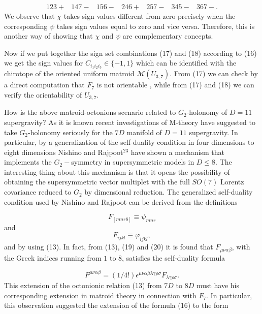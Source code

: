 \documentclass[a4paper,12pt]{article}
\begin{document}
\begin{equation}
\begin{array}{ccccccc}
123+ & 147- & 156- & 246+ & 257- & 345- & 367-.
\end{array}
\label{18}
\end{equation}
We observe that $\chi $ takes sign values different from zero precisely when
the corresponding $\psi $ takes sign values equal to zero and vice versa.
Therefore, this is another way of showing that $\chi $ and $\psi $ are
complementary concepts.

Now if we put together the sign set combinations (17) and (18) according to
(16) we get the sign values for $C_{i_{1}i_{2}i_{3}}\in \{-1,1\}$ which can
be identified with the chirotope of the oriented uniform matroid $\mathcal{M}%
(U_{3,7}).$ From (17) we can check by a direct computation that $F_{7}$ is
not orientable , while from (17) and (18) we can verify the orientability of 
$U_{3,7}$.

How is the above matroid-octonions scenario related to $G_{2}$-holonomy of $%
D=11$ supergravity? As it is known recent investigations of M-theory have
suggested to take $G_{2}$-holonomy seriously for the $7D$ manifold of $D=11$
supergravity. In particular, by a generalization of the self-duality
condition in four dimensions to eight dimensions Nishino and Rajpoot$^{23}$
have shown a mechanism that implements the $G_{2}-$symmetry in
supersymmetric models in $D\leq 8$. The interesting thing about this
mechanism is that it opens the possibility of obtaining the supersymmetric
vector multiplet with the full $SO(7)$ Lorentz covariance reduced to $G_{2}$
by dimensional reduction. The generalized self-duality condition used by
Nishino and Rajpoot can be derived from the definitions

\begin{equation}
F_{[mnr8]}\equiv \psi _{mnr}  \label{19}
\end{equation}
and 
\begin{equation}
F_{ijkl}\equiv \varphi _{ijkl},  \label{20}
\end{equation}
and by using (13). In fact, from (13), (19) and (20) it is found that $%
F_{\mu \nu \alpha \beta }$, with the Greek indices running from $1$ to $8$,
satisfies the self-duality formula

\begin{equation}
F^{\mu \nu \alpha \beta }=(1/4!)\epsilon ^{\mu \nu \alpha \beta \lambda
\gamma \rho \sigma }F_{\lambda \gamma \rho \sigma }.  \label{21}
\end{equation}
This extension of the octonionic relation (13) from $7D$ to $8D$ must have
his corresponding extension in matroid theory in connection with $F_{7}$. In
particular, this observation suggested the extension of the formula (16) to
the form
\end{document}
